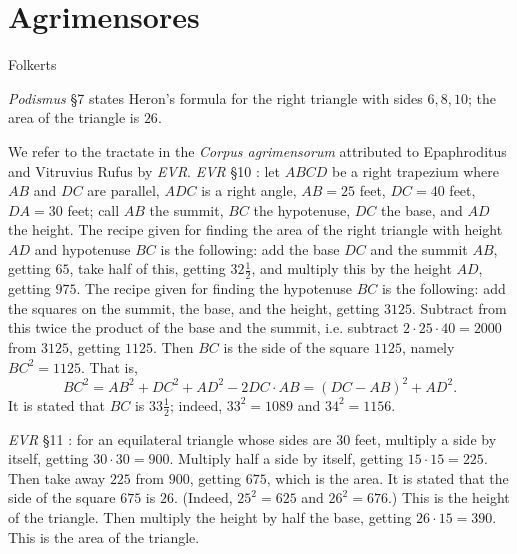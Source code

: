 \documentclass{article}
\theoremstyle{definition}
\begin{document}
\section{Agrimensores}
Folkerts \cite{folkerts}

{\em Podismus} \S 7 \cite[pp.~134--137]{guillaumin} states Heron's formula for the right triangle with sides
$6,8,10$; the area of the triangle is $26$.  

We refer to the tractate in the {\em Corpus agrimensorum} attributed to Epaphroditus and Vitruvius Rufus by {\em EVR}. {\em EVR}  
\S 10 \cite[pp.~140--141]{guillaumin}: let $ABCD$ be a right trapezium where $AB$ and $DC$ are parallel, $ADC$ is a right angle,
$AB=25$ feet, $DC=40$ feet, $DA=30$ feet; call $AB$ the summit, $BC$ the hypotenuse, $DC$ the base, and $AD$ the height.
The recipe given for finding the area
of the right triangle with height $AD$ and hypotenuse $BC$ is the following:
add the base $DC$ and the summit $AB$, getting $65$,  take half of this, getting $32 \frac{1}{2}$, and multiply this
by the height $AD$, getting $975$. The recipe given for finding the
hypotenuse $BC$ is the following: add the 
squares on the summit, the base, and the height, getting $3125$. 
Subtract from this twice the product of the base and the summit, i.e. subtract $2 \cdot 25 \cdot 40 = 2000$ from $3125$, getting $1125$. Then $BC$ is the side
of the square $1125$, namely $BC^2=1125$. That is, 
\[
BC^2 = AB^2+DC^2+AD^2 - 2  DC \cdot AB = (DC-AB)^2 + AD^2.
\]
It is stated that $BC$ is $33 \frac{1}{2}$; indeed, $33^2=1089$ and $34^2=1156$.

{\em EVR} \S 11 \cite[pp.~140--143]{guillaumin}: for an equilateral triangle whose sides are $30$ feet,
multiply a side by itself, getting $30\cdot 30 = 900$. Multiply half a side by itself, getting $15\cdot 15 = 225$. Then take away $225$ from
$900$, getting $675$, which is the area. It is stated that the side of the square $675$ is $26$. (Indeed, $25^2=625$ and $26^2=676$.)
This is the height of the triangle.
Then multiply  the height by half the base, getting $26\cdot 15 = 390$. This is the area of the triangle.
\end{document}
